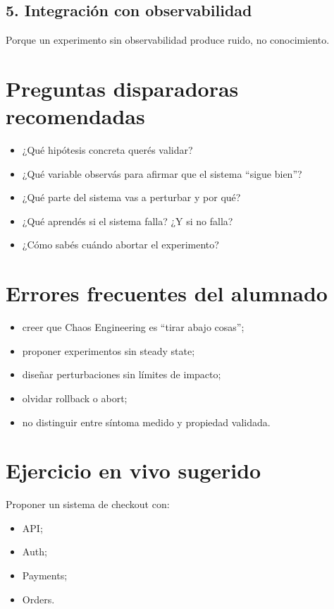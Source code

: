 \documentclass[variant=docente,cover=institutional,mode=screen]{ua-engineering-v6-article}
\begin{document}
\subsection*{5. Integración con observabilidad}
Porque un experimento sin observabilidad produce ruido, no conocimiento.

\section{Preguntas disparadoras recomendadas}

\begin{itemize}
\item ¿Qué hipótesis concreta querés validar?
\item ¿Qué variable observás para afirmar que el sistema “sigue bien”?
\item ¿Qué parte del sistema vas a perturbar y por qué?
\item ¿Qué aprendés si el sistema falla? ¿Y si no falla?
\item ¿Cómo sabés cuándo abortar el experimento?
\end{itemize}

\section{Errores frecuentes del alumnado}

\begin{itemize}
\item creer que Chaos Engineering es “tirar abajo cosas”;
\item proponer experimentos sin steady state;
\item diseñar perturbaciones sin límites de impacto;
\item olvidar rollback o abort;
\item no distinguir entre síntoma medido y propiedad validada.
\end{itemize}

\section{Ejercicio en vivo sugerido}

Proponer un sistema de checkout con:
\begin{itemize}
\item API;
\item Auth;
\item Payments;
\item Orders.
\end{itemize}
\end{document}
